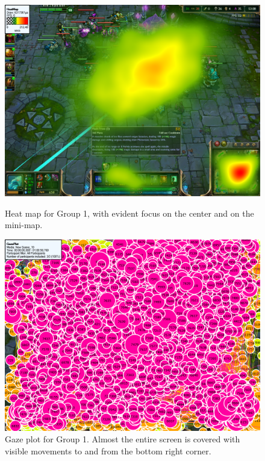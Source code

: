 \documentclass[notitlepage]{report}
\begin{document}
\begin{figure}[!ht]
\begin{minipage}[t]{0.45\linewidth}
\centering
\includegraphics[width=\textwidth]{images/heatmap/Noobs}
\caption{Heat map for Group 1, with evident focus on the center and on the mini-map.}
\label{heat_noob}
\end{minipage}
\hspace{0.5cm}
\begin{minipage}[t]{0.45\linewidth}
\centering
\includegraphics[width=\textwidth]{images/gazeplot/Noobs}
\caption{Gaze plot for Group 1. Almost the entire screen is covered with visible movements to and from the bottom right corner.}
\label{gaze_noob}
\end{minipage}
\end{figure}
\end{document}
